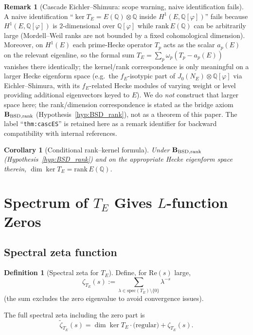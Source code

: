 \documentclass[11pt, a4paper]{amsart}
\newtheorem{corollary}[theorem]{Corollary}
\theoremstyle{definition}
\newtheorem{definition}[theorem]{Definition}
\newtheorem{remark}[theorem]{Remark}
\newcommand{\Q}{\mathbb{Q}}
\newcommand{\pphi}{\varphi}
\begin{document}
\begin{remark}[Cascade Eichler--Shimura: scope warning, naive identification fails]\label{thm:cascES}
A naive identification ``$\ker T_E = E(\Q)\otimes\Q$ inside
$H^1(E,\Q[\pphi])$'' fails because $H^1(E,\Q[\pphi])$ is
$2$-dimensional over $\Q[\pphi]$ while $\mathrm{rank}\,E(\Q)$ can
be arbitrarily large (Mordell--Weil ranks are not bounded by a
fixed cohomological dimension). Moreover, on $H^1(E)$ each
prime-Hecke operator $T_p$ acts as the scalar $a_p(E)$ on the
relevant eigenline, so the formal sum
$T_E = \sum_p \omega_p (T_p - a_p(E))$ vanishes there
identically; the kernel/rank correspondence is only meaningful on
a larger Hecke eigenform space (e.g.\ the $f_E$-isotypic part of
$J_0(N_E)\otimes\Q[\pphi]$ via Eichler--Shimura, with its
$f_E$-related Hecke modules of varying weight or level providing
additional eigenvectors keyed to $E$). We do \emph{not} construct
that larger space here; the rank/dimension correspondence is
stated as the bridge axiom $\mathbf{B_{\rm BSD,rank}}$
(Hypothesis~\ref{hyp:BSD_rank}), not as a theorem of this paper.
The label ``\texttt{thm:cascES}'' is retained here as a remark
identifier for backward compatibility with internal references.
\end{remark}

\begin{corollary}[Conditional rank--kernel formula]\label{cor:dimkerT}
Under $\mathbf{B_{\rm BSD,rank}}$ (Hypothesis~\ref{hyp:BSD_rank})
and on the appropriate Hecke eigenform space therein,
$\dim\ker T_E = \mathrm{rank}\,E(\Q)$.
\end{corollary}

\section{Spectrum of $T_E$ Gives $L$-function Zeros}

\subsection{Spectral zeta function}

\begin{definition}[Spectral zeta for $T_E$]\label{def:speczeta}
Define, for $\mathrm{Re}(s)$ large,
\[
\zeta_{T_E}(s) := \sum_{\lambda \in \mathrm{spec}(T_E) \setminus \{0\}} \lambda^{-s}
\]
(the sum excludes the zero eigenvalue to avoid convergence issues).

The full spectral zeta including the zero part is
\[
\tilde\zeta_{T_E}(s) = \dim \ker T_E \cdot \text{(regular)} + \zeta_{T_E}(s).
\]
\end{definition}
\end{document}
